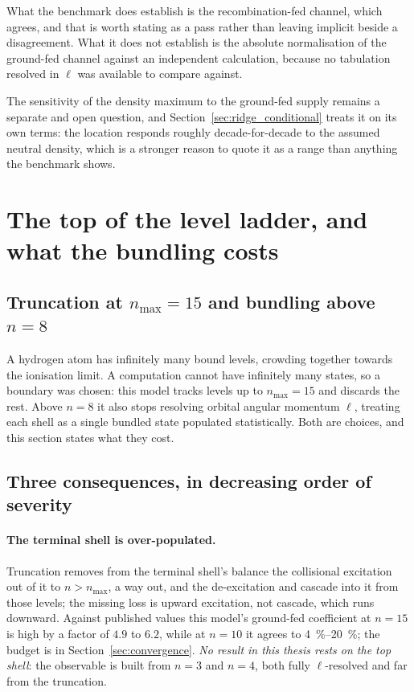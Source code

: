 What the benchmark does establish is the recombination-fed channel, which
agrees, and that is worth stating as a pass rather than leaving implicit beside
a disagreement. What it does not establish is the absolute normalisation of the
ground-fed channel against an independent calculation, because no tabulation
resolved in $\ell$ was available to compare against.

The sensitivity of the density maximum to the ground-fed supply remains a
separate and open question, and Section~\ref{sec:ridge_conditional} treats it
on its own terms: the location responds roughly decade-for-decade to the assumed
neutral density, which is a stronger reason to quote it as a range than
anything the benchmark shows.

\section{The top of the level ladder, and what the bundling costs}
\label{sec:nmax}

\subsection{Truncation at $n_{\max} = 15$ and bundling above $n = 8$}

A hydrogen atom has infinitely many bound levels, crowding together towards the
ionisation limit. A computation cannot have infinitely many states, so a
boundary was chosen: this model tracks levels up to $n_{\max} = 15$ and
discards the rest. Above $n = 8$ it also stops resolving orbital angular
momentum $\ell$, treating each shell as a single bundled state populated
statistically. Both are choices, and this section states what they cost.

\subsection{Three consequences, in decreasing order of severity}

\paragraph{The terminal shell is over-populated.} Truncation removes from the
terminal shell's balance the collisional excitation out of it to $n > n_{\max}$,
a way out, and the de-excitation and cascade into it from those levels; the
missing loss is upward excitation, not cascade, which runs downward. Against
published values
this model's ground-fed coefficient at $n = 15$ is high by a factor of $4.9$ to
$6.2$, while at $n = 10$ it agrees to \SIrange{4}{20}{\percent}; the budget is
in Section~\ref{sec:convergence}. \emph{No result in this thesis rests on the
top shell}: the observable is built from $n = 3$ and $n = 4$, both fully
$\ell$-resolved and far from the truncation.

